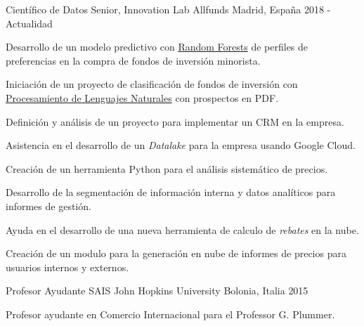 

\begin{cventries}

\cventry
    {Científico de Datos Senior, Innovation Lab} %
    {Allfunds} %
    {Madrid, España} %
    {2018 - Actualidad} %
    {
        \begin{cvitems} %
            \item {Desarrollo de un modelo predictivo con \href{https://es.wikipedia.org/wiki/Random_forest}{Random Forests} de perfiles de preferencias en la compra de fondos de inversión minorista.}
            \item {Iniciación de un proyecto de clasificación de fondos de inversión con \href{https://es.wikipedia.org/wiki/Procesamiento_de_lenguajes_naturales}{Procesamiento de Lenguajes Naturales} con prospectos en PDF.}
            \item {Definición y análisis de un proyecto para implementar un CRM en la empresa.}
            \item {Asistencia en el desarrollo de un \textit{Datalake} para la empresa usando Google Cloud.}
            \item {Creación de un herramienta Python para el análisis sistemático de precios.}
            \item {Desarrollo de la segmentación de información interna y datos analíticos para informes de gestión.}
            \item {Ayuda en el desarrollo de una nueva herramienta de calculo de \textit{rebates} en la nube.}
            \item {Creación de un modulo para la generación en nube de informes de precios para usuarios internos y externos.}
        \end{cvitems}
    }

\cventry
    {Profesor Ayudante} %
    {SAIS John Hopkins University} %
    {Bolonia, Italia} %
    {2015} %
    {
        \begin{cvitems} %
            \item {Profesor ayudante en Comercio Internacional para el Professor G. Plummer.}
        \end{cvitems}
    }


\end{cventries}
